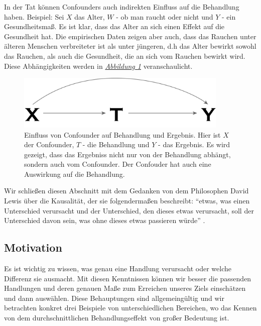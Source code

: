 \documentclass[12pt,a4paper,twoside]{scrartcl}
\numberwithin{equation}{section}
\newcommand{\reffig}[1]{\emph{\hyperref[#1]{Abbildung \ref*{#1}}}}
\begin{document}
\noindent
In der Tat können Confounders auch indirekten Einfluss auf die Behandlung haben. Beispiel: Sei $X$ das Alter, $W$ - ob man raucht oder nicht und $Y$ - ein Gesundheitsmaß. Es ist klar, dass das Alter an sich einen Effekt auf die Gesundheit hat. Die empirischen Daten zeigen aber auch, dass das Rauchen unter älteren Menschen verbreiteter ist als unter jüngeren, d.h das Alter bewirkt sowohl das Rauchen, als auch die Gesundheit, die an sich vom Rauchen bewirkt wird. Diese Abhängigkeiten werden in \reffig{fig:confounder} veranschaulicht.\par   	
\begin{center}
  \vspace{6mm}
  \begin{figure}[h]
    \centering
    \includegraphics[height=0.4\textwidth, width=0.9\textwidth]{figures/confounder.png}
    \caption[Einfluss von Confounder auf Behandlung und Ergebnis]{Einfluss von Confounder auf Behandlung und Ergebnis\cite{RebBar}. Hier ist $X$ der Confounder, $T$ - die Behandlung und $Y$ - das Ergebnis. Es wird gezeigt, dass das Ergebniss nicht nur von der Behandlung abhängt, sondern auch vom Confounder. Der Confouder hat auch eine Auswirkung auf die Behandlung.}\label{fig:confounder}
  \end{figure}
\end{center}

\noindent
Wir schließen diesen Abschnitt mit dem Gedanken von dem Philosophen David Lewis über die Kausalität, der sie folgendermaßen beschreibt: \enquote{etwas, was einen Unterschied verursacht und der Unterschied, den dieses etwas verursacht, soll der Unterschied  davon sein, was ohne dieses etwas passieren würde} \cite{lewis1974causation}.\par

\subsection{Motivation}\label{subsec:motivation}
Es ist wichtig zu wissen, was genau eine Handlung verursacht oder welche Differenz sie ausmacht. Mit diesen Kenntnissen können wir besser die passenden Handlungen und deren genauen Maße zum Erreichen unseres Ziels einschätzen und dann auswählen. Diese Behauptungen sind allgemeingültig und wir betrachten konkret drei Beispiele von unterschiedlichen Bereichen, wo das Kennen von dem durchschnittlichen Behandlungseffekt von großer Bedeutung ist.\par
\end{document}
